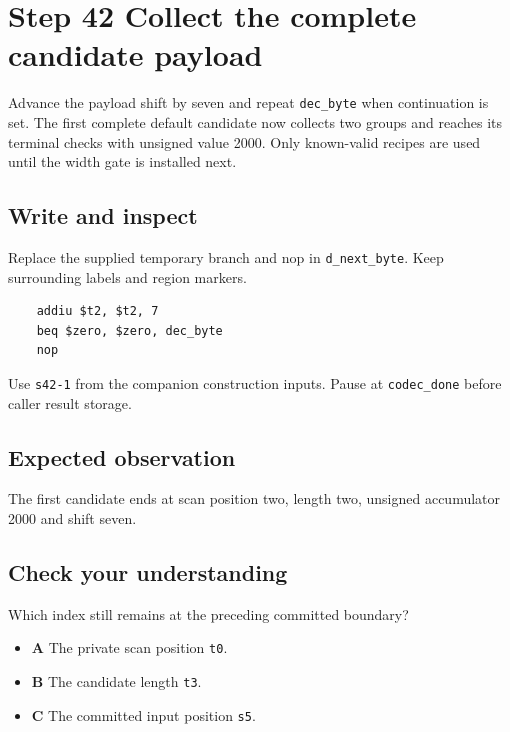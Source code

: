 \section{Step 42 Collect the complete candidate payload}\label{delta-s42}

Advance the payload shift by seven and repeat \texttt{dec\_byte} when continuation is set. The first complete default candidate now collects two groups and reaches its terminal checks with unsigned value 2000. Only known-valid recipes are used until the width gate is installed next.

\subsection{Write and inspect}
Replace the supplied temporary branch and nop in \texttt{d\_next\_byte}. Keep surrounding labels and region markers.

\begin{verbatim}
    addiu $t2, $t2, 7
    beq $zero, $zero, dec_byte
    nop
\end{verbatim}
Use \texttt{s42-1} from the companion construction inputs. Pause at \texttt{codec\_done} before caller result storage.

\subsection{Expected observation}
The first candidate ends at scan position two, length two, unsigned accumulator 2000 and shift seven.

\subsection{Check your understanding}
Which index still remains at the preceding committed boundary?

\begin{itemize}
\item \textbf{A} The private scan position \texttt{t0}.
\item \textbf{B} The candidate length \texttt{t3}.
\item \textbf{C} The committed input position \texttt{s5}.
\end{itemize}
